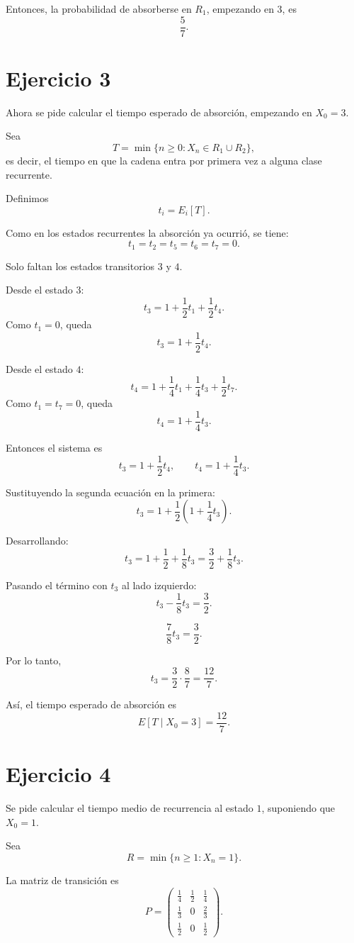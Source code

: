 \documentclass[12pt]{article}
\begin{document}
Entonces, la probabilidad de absorberse en \(R_1\), empezando en \(3\), es
\[
\boxed{\frac{5}{7}}.
\]

\newpage
\section*{Ejercicio 3}

Ahora se pide calcular el tiempo esperado de absorción, empezando en \(X_0=3\).

Sea
\[
T=\min\{n\geq 0: X_n\in R_1\cup R_2\},
\]
es decir, el tiempo en que la cadena entra por primera vez a alguna clase recurrente.

Definimos
\[
t_i=E_i[T].
\]

Como en los estados recurrentes la absorción ya ocurrió, se tiene:
\[
t_1=t_2=t_5=t_6=t_7=0.
\]

Solo faltan los estados transitorios \(3\) y \(4\).

Desde el estado \(3\):
\[
t_3=1+\frac12 t_1+\frac12 t_4.
\]
Como \(t_1=0\), queda
\[
t_3=1+\frac12 t_4.
\]

Desde el estado \(4\):
\[
t_4=1+\frac14 t_1+\frac14 t_3+\frac12 t_7.
\]
Como \(t_1=t_7=0\), queda
\[
t_4=1+\frac14 t_3.
\]

Entonces el sistema es
\[
t_3=1+\frac12 t_4,
\qquad
t_4=1+\frac14 t_3.
\]

Sustituyendo la segunda ecuación en la primera:
\[
t_3=1+\frac12\left(1+\frac14 t_3\right).
\]

Desarrollando:
\[
t_3=1+\frac12+\frac18 t_3
=\frac32+\frac18 t_3.
\]

Pasando el término con \(t_3\) al lado izquierdo:
\[
t_3-\frac18 t_3=\frac32.
\]

\[
\frac78 t_3=\frac32.
\]

Por lo tanto,
\[
t_3=\frac32\cdot\frac87=\frac{12}{7}.
\]

Así, el tiempo esperado de absorción es
\[
\boxed{E[T\mid X_0=3]=\frac{12}{7}}.
\]

\newpage
\section*{Ejercicio 4}

Se pide calcular el tiempo medio de recurrencia al estado \(1\), suponiendo que \(X_0=1\).

Sea
\[
R=\min\{n\geq 1:X_n=1\}.
\]

La matriz de transición es
\[
P=
\begin{pmatrix}
\frac14 & \frac12 & \frac14\\[4pt]
\frac13 & 0 & \frac23\\[4pt]
\frac12 & 0 & \frac12
\end{pmatrix}.
\]
\end{document}
